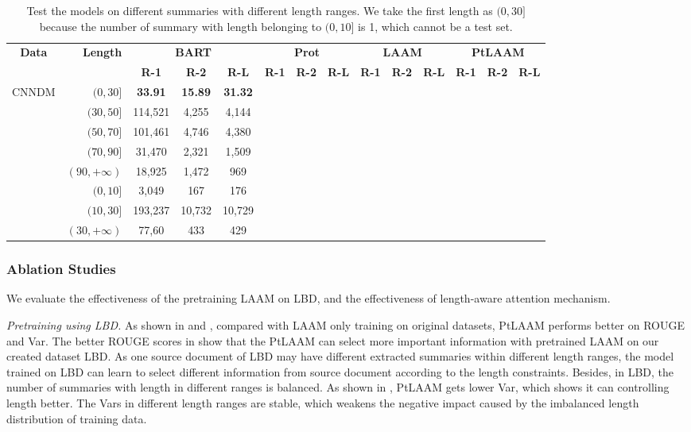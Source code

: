 {\begin{table}[th]
	\scriptsize
	\centering
	\begin{tabular}{|c|r|ccc|ccc|ccc|ccc|}
		\hline
		\multirow{2}{*}{\bf Data}& \multirow{2}{*}{\bf Length} & \multicolumn{3}{|c|}{\bf BART} &  \multicolumn{3}{|c|}{\bf Prot} & \multicolumn{3}{|c|}{\bf LAAM} & \multicolumn{3}{|c|}{\bf PtLAAM} \\
		\cline{3-14}
		& & \bf R-1 & \bf R-2 & \bf R-L & \bf R-1 & \bf R-2 & \bf R-L& \bf R-1 & \bf R-2 & \bf R-L& \bf R-1 & \bf R-2 & \bf R-L \\ 
		\hline
		\multirow{6}{*}{CNNDM} 
		& $(0,30]$ & \bf 33.91& \bf 15.89 &\bf 31.32 & & & & & & & & & \\
		& $(30,50]$ & 114,521 &4,255&4,144& & & & & & & & & \\
		& $(50,70]$& 101,461 & 4,746 &4,380 & & & & & & & & & \\
		& $(70,90]$ & 31,470 & 2,321 & 1,509& & & & & & & & &\\
		& $(90,+\infty)$ & 18,925&1,472 &969 & & & & & & & & \\
		\hline
		\multirow{4}{*}{XSUM} 
		&$(0,10]$ & 3,049 & 167 & 176 & & & & & & & & \\
		& $(10,30]$ & 193,237 & 10,732 & 10,729 && & & & & & & &\\
		& $(30,+\infty)$ & 77,60 & 433 & 429 & & & & & & & & &\\
		\hline
	\end{tabular}
\caption{Test the models on different summaries with different length ranges. We take the first length as $(0,30]$ because the number of summary with length belonging to $(0,10]$ is 1, which cannot be a test set.
}\label{tab:genrange}  
\end{table}
}%

\subsubsection{Ablation Studies}
We evaluate the effectiveness of the pretraining LAAM on LBD,
and the effectiveness of length-aware attention mechanism.

\textit{Pretraining using LBD.} 
As shown in  and ,
compared with LAAM only training on original datasets, PtLAAM performs better on ROUGE and Var. 
The better ROUGE scores in  show that the PtLAAM can select more important information with pretrained LAAM on our created dataset LBD.
As one source document of LBD may have different extracted summaries within different length ranges, the model trained on LBD can learn to select different information from source document according to the length constraints.
Besides, in LBD, the number of summaries with length in different ranges is balanced.
As shown in ,
PtLAAM gets lower Var, which shows it can controlling length better.
The Vars in different length ranges are stable, which 
weakens the negative impact caused by the imbalanced length distribution of training data. 

